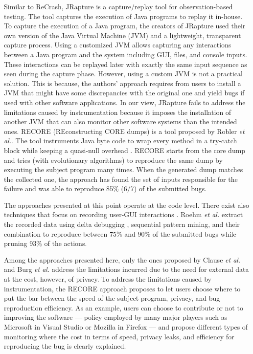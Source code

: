 Similar to ReCrash, JRapture \cite{Steven2000} is a capture/replay tool for observation-based testing.
The tool captures the execution of Java programs to replay it in-house.
To capture the execution of a Java program, the creators of JRapture used their own version of the Java Virtual Machine (JVM) and a lightweight, transparent capture process.
Using a customized JVM allows capturing any interactions between a Java program and the system including GUI, files, and console inputs.
These interactions can be replayed later  with exactly the same input sequence as seen during the capture phase.
However, using a custom JVM is not a practical solution.
This is because, the authors' approach requires from users to install a JVM that might have some discrepancies with the original one and yield bugs if used with other software applications.
In our view,  JRapture fails to address the limitations caused by instrumentation because it imposes the installation of another JVM that can also monitor other software systems than the intended ones.
RECORE (REconstructing CORE dumps) is a tool proposed by Robler {\it et al.}.
The tool instruments Java byte code to wrap every method in a try-catch block while keeping a quasi-null overhead \cite{Rossler2013}.
RECORE starts from the core dump and tries (with evolutionary algorithms) to reproduce the same dump by executing the subject program many times.
When the generated dump matches the collected one, the approach has found the set of inputs responsible for the failure and was able to reproduce 85\% (6/7) of the submitted bugs.

The approaches presented at this point operate at the code level.
There exist also techniques that focus on recording user-GUI interactions \cite{Herbold2011,Roehm2015}.
Roehm {\it et al.} extract the recorded data using delta debugging \cite{Zeller2002}, sequential pattern mining, and their combination to reproduce between 75\% and 90\% of the submitted bugs while pruning 93\% of the actions.

Among the approaches presented here, only the ones proposed by Clause {\it et al.} and Burg {\it et al.} address the limitations incurred due to the need for external data  at the cost, however, of privacy.
To address the limitations caused by instrumentation,  the RECORE approach proposes to let users choose where to put the bar between the speed of the subject program, privacy, and bug reproduction efficiency.
As an example, users can choose to contribute or not to improving the software --- policy employed by many major players such as Microsoft in Visual Studio or Mozilla in Firefox --- and propose different types of monitoring where the cost in terms of speed, privacy leaks, and efficiency for reproducing the bug is clearly explained.

